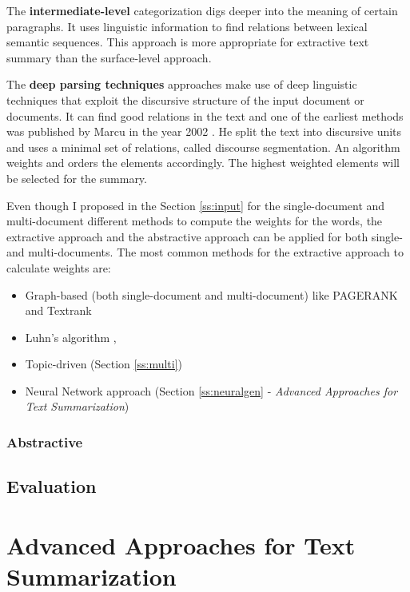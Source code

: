 The \textbf{intermediate-level} categorization digs deeper into the meaning of certain paragraphs. It uses linguistic information to find relations between lexical semantic sequences. This approach is more appropriate for extractive text summary than the surface-level approach.

The \textbf{deep parsing techniques} approaches make use of deep linguistic techniques that exploit the discursive structure of the input document or documents. It can find good relations in the text and one of the earliest methods was published by Marcu in the year 2002 \cite{marcu}. He split the text into discursive units and uses a minimal set of relations, called discourse segmentation. An algorithm weights and orders the elements accordingly. The highest weighted elements will be selected for the summary.

Even though I proposed in the Section \ref{ss:input} for the single-document and multi-document different methods to compute the weights for the words, the extractive approach and the abstractive approach can be applied for both single- and multi-documents. The most common methods for the extractive approach to calculate weights are:

\begin{itemize}
	\item Graph-based (both single-document and multi-document) like PAGERANK and Textrank
	\item Luhn's algorithm \cite{textmining1958}, 
	\item Topic-driven (Section \ref{ss:multi}) 
	\item Neural Network approach (Section \ref{ss:neuralgen} - \textit{Advanced Approaches for Text Summarization})
\end{itemize}

\subsubsection{Abstractive}

\subsection{Evaluation}\label{ss:ev}



\section{Advanced Approaches for Text Summarization}\label{ss:trends}

